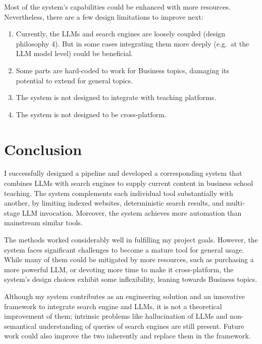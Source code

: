 \documentclass[final-report]{report-template}
\begin{document}
Most of the system's capabilities could be enhanced with more resources.
Nevertheless, there are a few design limitations to improve next: 
\begin{enumerate}
	\item Currently, the LLMs and search engines are loosely coupled (design
		philosophy 4). But in some cases integrating them more deeply (e.g.\ at
		the LLM model level) could be beneficial.
	\item Some parts are hard-coded to work for Business topics, damaging its
		potential to extend for general topics.
	\item The system is not designed to integrate with teaching platforms.
	\item The system is not designed to be cross-platform.
\end{enumerate}

\section{Conclusion}
I successfully designed a pipeline and developed a corresponding system
that combines LLMs with search engines to supply current content in business
school teaching. The system complements each individual tool substantially with
another, by limiting indexed websites, deterministic search results, and
multi-stage LLM invocation. Moreover, the system achieves more automation than
mainstream similar tools.

The methods worked considerably well in fulfilling my project goals. However,
the system faces significant challenges to become a mature tool for general
usage. While many of them could be mitigated by more resources, such as
purchasing a more powerful LLM, or devoting more time to make it
cross-platform, the system's design choices exhibit some inflexibility, leaning
towards Business topics.

Although my system contributes as an engineering solution and an innovative
framework to integrate search engine and LLMs, it is not a theoretical
improvement of them; intrinsic problems like hallucination of LLMs and
non-semantical understanding of queries of search engines are still present.
Future work could also improve the two inherently and replace them in the
framework.

\clearpage

 

\end{document}
